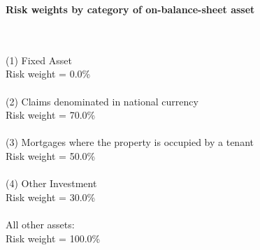\documentclass{article}
\begin{document}
\setlength{\parindent}{0em}
\begin{center}{\bf Risk weights by category of on-balance-sheet asset}\end{center}
~\\
~\\

(1) Fixed Asset\\
Risk weight = 0.0\%\\

~\\
(2) Claims denominated in national currency \\
Risk weight = 70.0\%\\

~\\
(3) Mortgages where the property is occupied by a tenant \\
Risk weight = 50.0\%\\

~\\
(4) Other Investment\\
Risk weight = 30.0\%\\

~\\
All other assets:\\
Risk weight = 100.0\%\\

~\\
\end{document}
